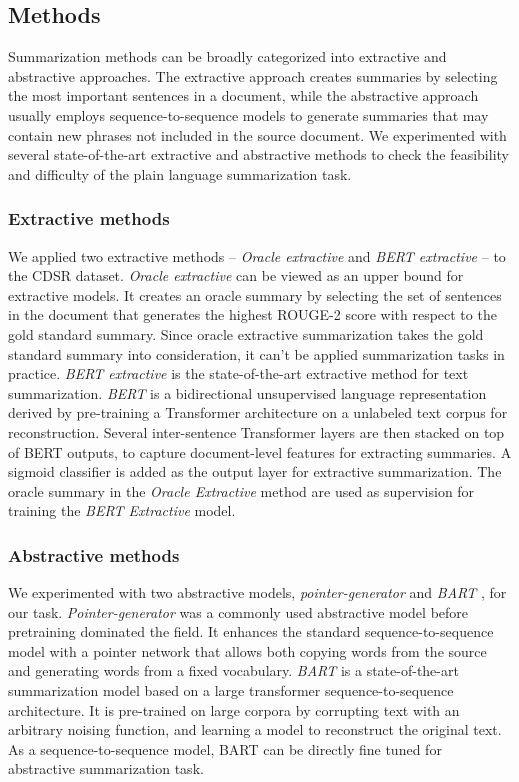 \documentclass[letterpaper, table]{article} %
\begin{document}
\subsection{Methods}
Summarization methods can be broadly categorized into extractive and abstractive approaches. The extractive approach
creates summaries by selecting the most important sentences in a document,
while the abstractive approach usually employs sequence-to-sequence models to generate summaries that may contain new phrases not included in the source document. We experimented with several state-of-the-art extractive and abstractive methods to check the feasibility and difficulty of the plain language summarization task.
\subsubsection{Extractive methods}
We applied two extractive methods -- \textit{Oracle extractive} and \textit{BERT extractive} \cite{liu2019text} -- to the CDSR dataset. \textit{Oracle extractive} can be viewed as an upper bound for extractive models. It creates an oracle summary by selecting the set of sentences in the document that generates the highest ROUGE-2 score with respect to the gold standard summary. Since oracle extractive summarization takes the gold standard summary into consideration, it can't be applied summarization tasks in practice. \textit{BERT extractive} is the state-of-the-art extractive method for text summarization. \textit{BERT} \cite{devlin2018bert} is a bidirectional unsupervised language representation derived by pre-training a Transformer architecture on a unlabeled text corpus for reconstruction. Several inter-sentence Transformer layers are then stacked on top of BERT outputs, to capture document-level features for extracting summaries. A sigmoid classifier is added as the output layer for extractive summarization. The oracle summary in the \textit{Oracle Extractive} method are used as supervision for training the \textit{BERT Extractive} model.
\subsubsection{Abstractive methods}
We experimented with two abstractive models, \textit{pointer-generator} \cite{see2017get} and \textit{BART} \cite{lewis2019bart}, for our task. \textit{Pointer-generator} was a commonly used abstractive model before pretraining dominated the field. It enhances the standard sequence-to-sequence model with a pointer network that allows both copying words from the source and generating words from a fixed vocabulary. \textit{BART} is a state-of-the-art summarization model based on a large transformer sequence-to-sequence architecture. It is pre-trained on large corpora by corrupting text with an arbitrary noising function, and learning a model to reconstruct the original text.
As a sequence-to-sequence model, BART can be directly fine tuned for abstractive summarization task.
\end{document}
